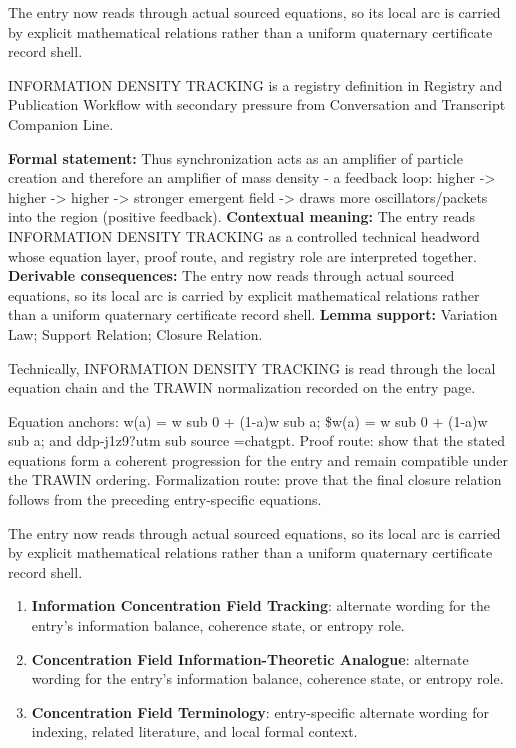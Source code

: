 The entry now reads through actual sourced equations, so its local arc is carried by explicit mathematical relations rather than a uniform quaternary certificate record shell.
\clearpage


\begingroup\small
{}
INFORMATION DENSITY TRACKING is a registry definition in Registry and Publication Workflow with secondary pressure from Conversation and Transcript Companion Line.

\begingroup\footnotesize\setlength{\emergencystretch}{3em}\sloppy
\textbf{Formal statement:} Thus synchronization acts as an amplifier of particle creation and therefore an amplifier of mass density - a feedback loop: higher -> higher -> higher -> stronger emergent field -> draws more oscillators/packets into the region (positive feedback). \textbf{Contextual meaning:} The entry reads INFORMATION DENSITY TRACKING as a controlled technical headword whose equation layer, proof route, and registry role are interpreted together. \textbf{Derivable consequences:} The entry now reads through actual sourced equations, so its local arc is carried by explicit mathematical relations rather than a uniform quaternary certificate record shell. \textbf{Lemma support:} Variation Law; Support Relation; Closure Relation.\par
\endgroup

Technically, INFORMATION DENSITY TRACKING is read through the local equation chain and the TRAWIN normalization recorded on the entry page.

Equation anchors: w(a) = w sub 0 + (1-a)w sub a; \$w(a) = w sub 0 + (1-a)w sub a; and ddp-j1z9?utm sub source =chatgpt. Proof route: show that the stated equations form a coherent progression for the entry and remain compatible under the TRAWIN ordering. Formalization route: prove that the final closure relation follows from the preceding entry-specific equations.

The entry now reads through actual sourced equations, so its local arc is carried by explicit mathematical relations rather than a uniform quaternary certificate record shell.
\endgroup

\begin{enumerate}[leftmargin=1.6em,itemsep=6pt,topsep=4pt]
\item \textbf{Information Concentration Field Tracking}: alternate wording for the entry's information balance, coherence state, or entropy role.
\item \textbf{Concentration Field Information-Theoretic Analogue}: alternate wording for the entry's information balance, coherence state, or entropy role.
\item \textbf{Concentration Field Terminology}: entry-specific alternate wording for indexing, related literature, and local formal context.
\end{enumerate}

